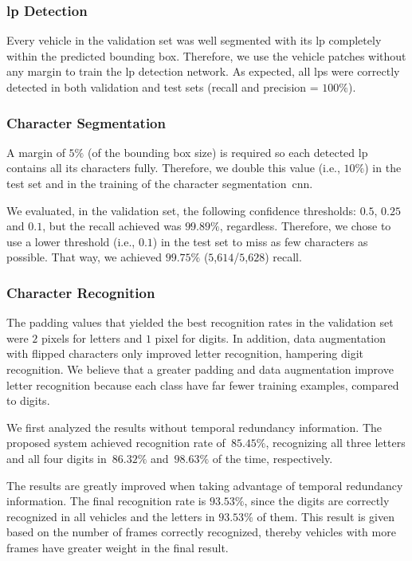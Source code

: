 \subsubsection{\gls*{lp} Detection}
Every vehicle in the validation set was well segmented with its \gls*{lp} completely within the predicted bounding box. Therefore, we use the vehicle patches without any margin to train the \gls*{lp} detection network. As expected, all \glspl*{lp} were correctly detected in both validation and test sets (recall and precision = $100\%$). 

\subsubsection{Character Segmentation}
A margin of $5\%$ (of the bounding box size) is required so each detected \gls*{lp} contains all its characters fully. Therefore, we double this value (i.e., $10\%$) in the test set and in the training of the character segmentation~\gls*{cnn}. 

We evaluated, in the validation set, the following confidence thresholds: $0.5$, $0.25$ and $0.1$, but the recall achieved was $99.89\%$, regardless. Therefore, we chose to use a lower threshold (i.e., $0.1$) in the test set to miss as few characters as possible. That way, we achieved $99.75\%$ ($5$,$614$/$5$,$628$) recall.

\subsubsection{Character Recognition}

The padding values that yielded the best recognition rates in the validation set were $2$ pixels for letters and $1$ pixel for digits. In addition, data augmentation with flipped characters only improved letter recognition, hampering digit recognition. We believe that a greater padding and data augmentation improve letter recognition because each class have far fewer training examples, compared to digits.

We first analyzed the results without temporal redundancy information. The proposed system achieved recognition rate of~$85.45\%$, recognizing all three letters and all four digits in~$86.32\%$ and~$98.63\%$ of the time, respectively. 

The results are greatly improved when taking advantage of temporal redundancy information. The final recognition rate is $93.53\%$, since the digits are correctly recognized in all vehicles and the letters in $93.53\%$ of them. This result is given based on the number of frames correctly recognized, thereby vehicles with more frames have greater weight in the final result.

